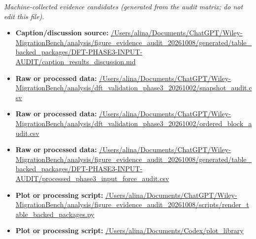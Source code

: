 \emph{Machine-collected evidence candidates (generated from the audit matrix; do not edit this file).}
\begin{itemize}[leftmargin=1.4em,noitemsep]
\item \textbf{Caption/discussion source:} \url{/Users/alina/Documents/ChatGPT/Wiley-MigrationBench/analysis/figure_evidence_audit_20261008/generated/table_backed_packages/DFT-PHASE3-INPUT-AUDIT/caption_results_discussion.md}
\item \textbf{Raw or processed data:} \url{/Users/alina/Documents/ChatGPT/Wiley-MigrationBench/analysis/dft_validation_phase3_20261002/snapshot_audit.csv}
\item \textbf{Raw or processed data:} \url{/Users/alina/Documents/ChatGPT/Wiley-MigrationBench/analysis/dft_validation_phase3_20261002/ordered_block_audit.csv}
\item \textbf{Raw or processed data:} \url{/Users/alina/Documents/ChatGPT/Wiley-MigrationBench/analysis/figure_evidence_audit_20261008/generated/table_backed_packages/DFT-PHASE3-INPUT-AUDIT/processed_phase3_input_force_audit.csv}
\item \textbf{Plot or processing script:} \url{/Users/alina/Documents/ChatGPT/Wiley-MigrationBench/analysis/figure_evidence_audit_20261008/scripts/render_table_backed_packages.py}
\item \textbf{Plot or processing script:} \url{/Users/alina/Documents/Codex/plot_library}
\end{itemize}
